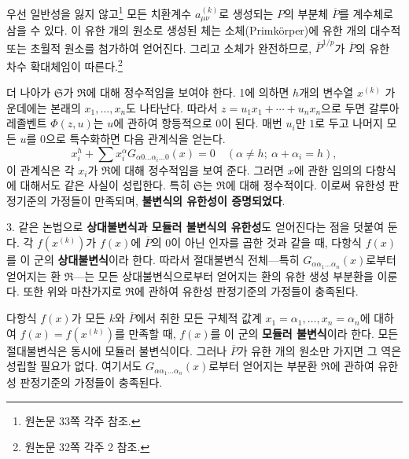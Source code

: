 우선 일반성을 잃지 않고\footnote{원논문 33쪽 각주 참조.} 모든 치환계수 $a_{\mu\nu}^{(k)}$로 생성되는 $P$의 부분체 $\overline P$를 계수체로 삼을 수 있다. 이 유한 개의 원소로 생성된 체는 소체(Primkörper)에 유한 개의 대수적 또는 초월적 원소를 첨가하여 얻어진다. 그리고 소체가 완전하므로, $\overline P^{1/p}$가 $\overline P$의 유한 차수 확대체임이 따른다.\footnote{원논문 32쪽 각주 2 참조.}

더 나아가 $\mathfrak S$가 $\mathfrak R$에 대해 정수적임을 보여야 한다. 1에 의하면 $h$개의 변수열 $x^{(k)}$ 가운데에는 본래의 $x_1,\ldots,x_n$도 나타난다. 따라서 $z=u_1x_1+\cdots+u_nx_n$으로 두면 갈루아 레졸벤트 $\Phi(z,u)$는 $u$에 관하여 항등적으로 $0$이 된다. 매번 $u_i$만 $1$로 두고 나머지 모든 $u$를 $0$으로 특수화하면 다음 관계식을 얻는다.
\[
 x_i^h+\sum x_i^\alpha G_{\alpha0\ldots\alpha_i\ldots0}(x)=0
 \quad (\alpha\ne h;\ \alpha+\alpha_i=h),
\]
이 관계식은 각 $x_i$가 $\mathfrak R$에 대해 정수적임을 보여 준다. 그러면 $x$에 관한 임의의 다항식에 대해서도 같은 사실이 성립한다. 특히 $\mathfrak S$는 $\mathfrak R$에 대해 정수적이다. 이로써 유한성 판정기준의 가정들이 만족되며, \textbf{불변식의 유한성이 증명되었다}.

3. 같은 논법으로 \textbf{상대불변식과 모듈러 불변식의 유한성}도 얻어진다는 점을 덧붙여 둔다. 각 $f(x^{(k)})$가 $f(x)$에 $\overline P$의 0이 아닌 인자를 곱한 것과 같을 때, 다항식 $f(x)$를 이 군의 \textbf{상대불변식}이라 한다. 따라서 절대불변식 전체---특히 $G_{\alpha\alpha_1\ldots\alpha_n}(x)$로부터 얻어지는 환 $\mathfrak R$---는 모든 상대불변식으로부터 얻어지는 환의 유한 생성 부분환을 이룬다. 또한 위와 마찬가지로 $\mathfrak R$에 관하여 유한성 판정기준의 가정들이 충족된다.

다항식 $f(x)$가 모든 $k$와 $\overline P$에서 취한 모든 구체적 값계 $x_1=\alpha_1,\ldots,x_n=\alpha_n$에 대하여 $f(x)=f(x^{(k)})$를 만족할 때, $f(x)$를 이 군의 \textbf{모듈러 불변식}이라 한다. 모든 절대불변식은 동시에 모듈러 불변식이다. 그러나 $\overline P$가 유한 개의 원소만 가지면 그 역은 성립할 필요가 없다. 여기서도 $G_{\alpha\alpha_1\ldots\alpha_n}(x)$로부터 얻어지는 부분환 $\mathfrak R$에 관하여 유한성 판정기준의 가정들이 충족된다.
